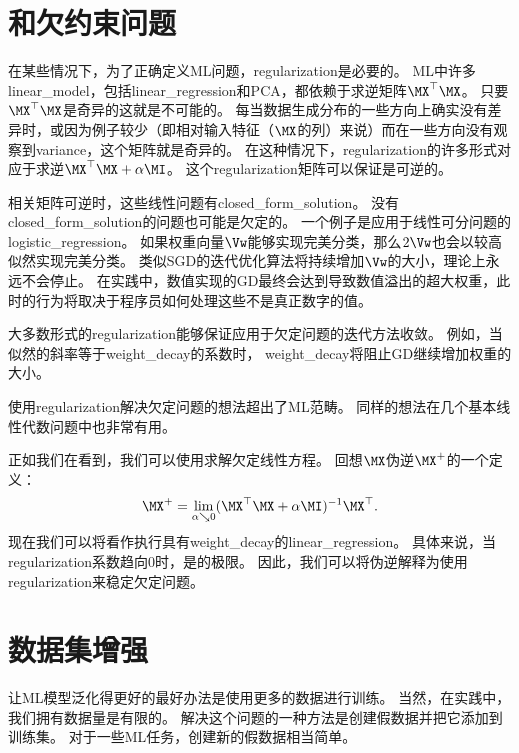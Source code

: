 \section{和欠约束问题}
\label{sec:regularization_and_under_constrained_problems}
在某些情况下，为了正确定义\gls{ML}问题，\gls{regularization}是必要的。
\gls{ML}中许多\gls{linear_model}，包括\gls{linear_regression}和PCA，都依赖于求逆矩阵$\MX^\top\MX$。
只要$\MX^\top\MX$是奇异的这就是不可能的。
每当数据生成分布的一些方向上确实没有差异时，或因为例子较少（即相对输入特征（$\MX$的列）来说）而在一些方向没有观察到\gls{variance}，这个矩阵就是奇异的。
在这种情况下，\gls{regularization}的许多形式对应于求逆$\MX^\top\MX + \alpha \MI$。
这个\gls{regularization}矩阵可以保证是可逆的。

相关矩阵可逆时，这些线性问题有\gls{closed_form_solution}。
没有\gls{closed_form_solution}的问题也可能是欠定的。
一个例子是应用于线性可分问题的\gls{logistic_regression}。
如果权重向量$\Vw$能够实现完美分类，那么$2 \Vw$也会以较高似然实现完美分类。
类似\gls{SGD}的迭代优化算法将持续增加$\Vw$的大小，理论上永远不会停止。
在实践中，数值实现的\gls{GD}最终会达到导致数值溢出的超大权重，此时的行为将取决于程序员如何处理这些不是真正数字的值。

大多数形式的\gls{regularization}能够保证应用于欠定问题的迭代方法收敛。
例如，当似然的斜率等于\gls{weight_decay}的系数时， \gls{weight_decay}将阻止\gls{GD}继续增加权重的大小。

使用\gls{regularization}解决欠定问题的想法超出了\gls{ML}范畴。
同样的想法在几个基本线性代数问题中也非常有用。


正如我们在看到，我们可以使用求解欠定线性方程。 
回想$\MX$伪逆$\MX^+$的一个定义：
\begin{align} 
\label{eq:729pseudo}
 \MX^+ = \lim_{\alpha \searrow 0} (\MX^\top \MX + \alpha \MI)^{-1}\MX^\top.
\end{align}
现在我们可以将看作执行具有\gls{weight_decay}的\gls{linear_regression}。
具体来说，当\gls{regularization}系数趋向0时，是的极限。
因此，我们可以将伪逆解释为使用\gls{regularization}来稳定欠定问题。


\section{数据集增强}
\label{sec:dataset_augmentation_chap7}
让\gls{ML}模型泛化得更好的最好办法是使用更多的数据进行训练。
当然，在实践中，我们拥有数据量是有限的。
解决这个问题的一种方法是创建假数据并把它添加到训练集。
对于一些\gls{ML}任务，创建新的假数据相当简单。


